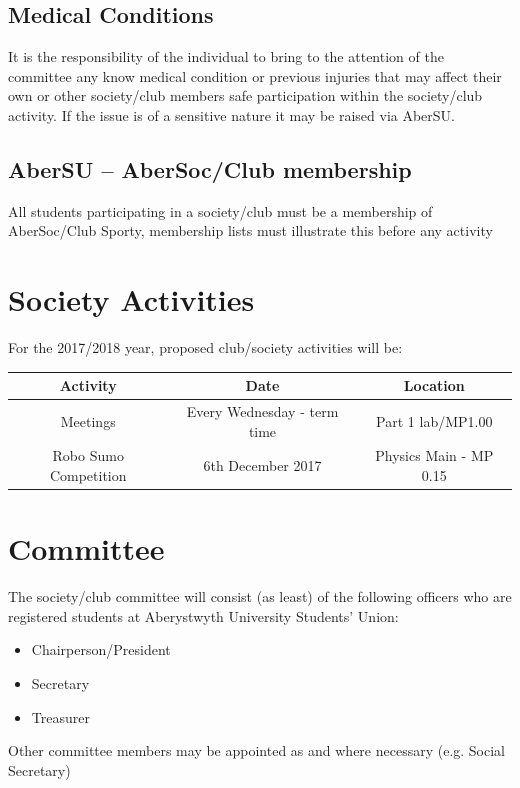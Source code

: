 \documentclass[a4paper,11pt]{article}
\begin{document}
\subsection{Medical Conditions}
It is the responsibility of the individual to bring to the attention of the committee any know medical condition or previous injuries that may affect their own or other society/club members safe participation within the society/club activity. If the issue is of a sensitive nature it may be raised via AberSU.

\subsection{AberSU – AberSoc/Club membership}
All students participating in a society/club must be a membership of AberSoc/Club Sporty, membership lists must illustrate this before any activity

\newpage
\section{Society Activities}
For the 2017/2018 year, proposed club/society activities will be:

\begin{center}
\begin{tabular}{ |c|c|c| } 
\hline
Activity & Date & Location \\
\hline
Meetings & Every Wednesday - term time & Part 1 lab/MP1.00 \\ 
\hline
Robo Sumo Competition & 6th December 2017 & Physics Main - MP 0.15 \\ 
\hline
\end{tabular}
\end{center}

\section{Committee}
The society/club committee will consist (as least) of the following officers who are registered students at Aberystwyth University Students' Union:
\begin{itemize}[nolistsep]
  \item Chairperson/President
  \item Secretary
  \item Treasurer
\end{itemize}
Other committee members may be appointed as and where necessary (e.g. Social Secretary)
\end{document}
